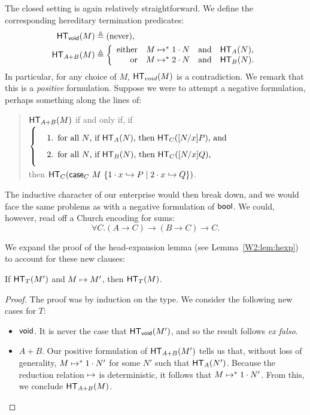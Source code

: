 \documentclass{article}
\begin{document}
The closed setting is again relatively straightforward.
We define the corresponding hereditary termination predicates:
\begin{align*}
  \mathsf{HT}_{\mathsf{void}}(M) &\triangleq \text{(never)},\\
  \mathsf{HT}_{A+B}(M) &\triangleq \left\{
                   \begin{array}{r l l l}
                     \text{either} & M \mapsto^* 1\cdot N & \text{and} & \mathsf{HT}_{A}(N),\\
                     \text{or} & M \mapsto^* 2\cdot N & \text{and} & \mathsf{HT}_{B}(N).\\
                   \end{array} \right.
\end{align*}
In particular, for any choice of $M$, $\mathsf{HT}_{void}(M)$ is a contradiction.
We remark that this is a \textit{positive} formulation.
Suppose we were to attempt a negative formulation, perhaps something along the lines of:
\begin{quote}
  $\mathsf{HT}_{A+B}(M)$ if and only if,
  if $\left\{\parbox{\linewidth}{\begin{enumerate}
      \item for all $N$, if $\hterm{A}{N}$, then $\hterm{C}{\subst{N}{x}{P}}$, and
      \item for all $N$, if $\hterm{B}{N}$, then $\hterm{C}{\subst{N}{x}{Q}}$,
  \end{enumerate}}\right.$
  then $\mathsf{HT}_{C}(\mathsf{case}_{C}\ M\ \{1\cdot x \hookrightarrow P \mid 2\cdot x \hookrightarrow Q\})$.
\end{quote}
The inductive character of our enterprise would then break down, and we would face the same problems as with a negative formulation of $\mathsf{bool}$.
We could, however, read off a Church encoding for sums:
\[
  \forall C. (A \to C) \to (B \to C) \to C.
\]

We expand the proof of the head-expansion lemma (see Lemma~\ref{W2:lem:hexp}) to account for these new clauses:

\begin{lemma}
  \label{lemma:closed-hexp-sums}
  If $\mathsf{HT}_{T}(M')$ and $M \mapsto M'$, then $\mathsf{HT}_{T}(M)$.
\end{lemma}

\begin{proof}
  The proof was by induction on the type.
  We consider the following new cases for $T$:
  \begin{itemize}
  \item $\mathsf{void}$. It is never the case that $\mathsf{HT}_{\mathsf{void}}(M')$, and so the result follows \textit{ex falso}.
  \item $A + B$. Our positive formulation of $\mathsf{HT}_{A+B}(M')$ tells us that, without loss of generality, $M \mapsto^* 1\cdot N'$ for some $N'$ such that $\mathsf{HT}_{A}(N')$.
    Because the reduction relation $ \mapsto $ is deterministic, it follows that $M \mapsto^* 1\cdot N'$.
    From this, we conclude $\mathsf{HT}_{A+B}(M)$.\qedhere
  \end{itemize}
\end{proof}
\end{document}
